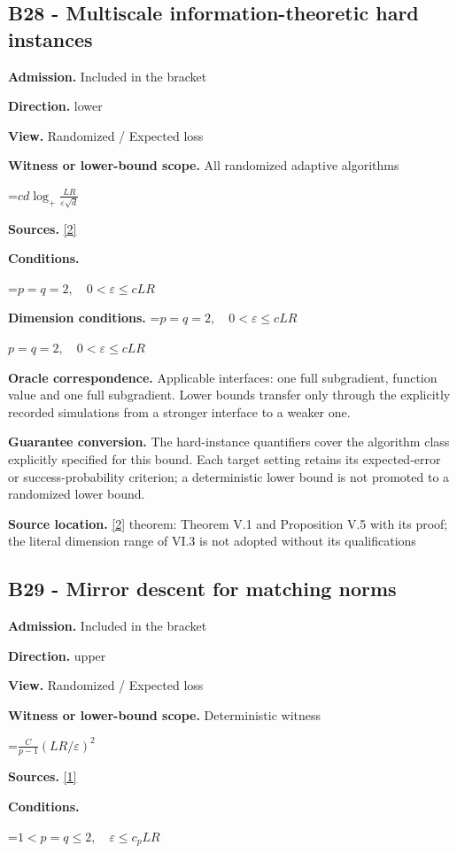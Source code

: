 \documentclass[10pt,a4paper]{article}
\newcommand{\AtlasMath}[1]{\par\begingroup\centering\setbox0=\hbox{$\displaystyle #1$}\ifdim\wd0>1.4\linewidth\typeout{ATLAS WIDE FORMULA: \the\wd0}\fi\ifdim\wd0>\linewidth\resizebox{\linewidth}{!}{\box0}\else\box0\fi\par\endgroup}
\newcommand{\AtlasInlineMath}[1]{\begingroup\setbox0=\hbox{$#1$}\ifdim\wd0>.4\linewidth\endgroup\AtlasMath{#1}\else\endgroup$#1$\fi}
\begin{document}
\subsection{B28 - Multiscale information-theoretic hard instances}
\textbf{Admission.} Included in the bracket

\textbf{Direction.} lower

\textbf{View.} Randomized / Expected loss

\textbf{Witness or lower-bound scope.} All randomized adaptive algorithms

\AtlasMath{c d\log_+\frac{LR}{\varepsilon\sqrt d}}
\textbf{Sources.} \href{https://arxiv.org/pdf/1407.5144}{[2]}

\textbf{Conditions.} 
\AtlasMath{p=q=2,\quad0<\varepsilon\le cLR}


\textbf{Dimension conditions.} \AtlasInlineMath{p=q=2,\quad0<\varepsilon\le cLR}

\textbf{Oracle correspondence.} Applicable interfaces: one full subgradient, function value and one full subgradient. Lower bounds transfer only through the explicitly recorded simulations from a stronger interface to a weaker one.

\textbf{Guarantee conversion.} The hard-instance quantifiers cover the algorithm class explicitly specified for this bound. Each target setting retains its expected-error or success-probability criterion; a deterministic lower bound is not promoted to a randomized lower bound.

\textbf{Source location.} \href{https://arxiv.org/pdf/1407.5144}{[2]} theorem: Theorem V.1 and Proposition V.5 with its proof; the literal dimension range of VI.3 is not adopted without its qualifications

\subsection{B29 - Mirror descent for matching norms}
\textbf{Admission.} Included in the bracket

\textbf{Direction.} upper

\textbf{View.} Randomized / Expected loss

\textbf{Witness or lower-bound scope.} Deterministic witness

\AtlasMath{\frac C{p-1}(LR/\varepsilon)^2}
\textbf{Sources.} \href{https://arxiv.org/pdf/1107.4080}{[1]}

\textbf{Conditions.} 
\AtlasMath{1<p=q\le2,\quad\varepsilon\le c_pLR}
\end{document}
